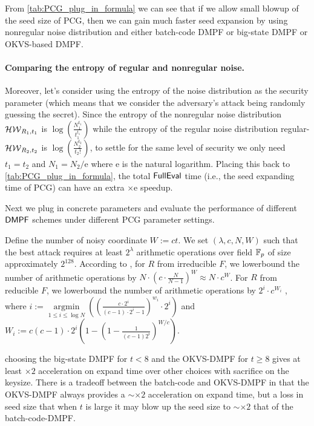 
From \cref{tab:PCG_plug_in_formula} we can see that if we allow small blowup of the seed size of PCG, then we can gain much faster seed expansion by using nonregular noise distribution and either batch-code DMPF or big-state DMPF or OKVS-based DMPF. 

\paragraph{Comparing the entropy of regular and nonregular noise.}Moreover, let's consider using the entropy of the noise distribution as the security parameter (which means that we consider the adversary's attack being randomly guessing the secret). Since the entropy of the nonregular noise distribution $\mathcal{HW}_{R_1,t_1}$ is $\log(\frac{N_1^{t_1}}{t_1^{t_1}})$ while the entropy of the regular noise distribution regular-$\mathcal{HW}_{R_2,t_2}$ is $\log(\frac{N_2^{t_2}}{t_2!})$, to settle for the same level of security we only need $t_1=t_2$ and $N_1 = N_2/\mathrm{e}$ where $\mathrm{e}$ is the natural logarithm. Placing this back to \cref{tab:PCG_plug_in_formula}, the total ${\sf FullEval}$ time (i.e., the seed expanding time of PCG) can have an extra $\times \mathrm{e}$ speedup. 


Next we plug in concrete parameters and evaluate the performance of different ${\sf DMPF}$ schemes under different PCG parameter settings. 

Define the number of noisy coordinate $W:=ct$. We set $(\lambda, c, N, W)$ such that the best attack requires at least $2^\lambda$ arithmetic operations over field $\mathbb{F}_p$ of size approximately $2^{128}$. According to \cite{cryptoeprint:2022/1035}, for $R$ from irreducible $F$, we lowerbound the number of arithmetic operations by $N\cdot (c\cdot \frac{N}{N-1})^W\approx N\cdot c^W$. For $R$ from reducible $F$, we lowerbound the number of arithmetic operations by $2^i\cdot c^{W_i}$ , where $i:=\mathop{\arg\min}\limits_{1\le i\le \log N}\left((\frac{c\cdot 2^i}{(c-1)\cdot 2^i-1})^{w_i}\cdot 2^i\right)$ and $W_i:=c(c-1)\cdot 2^i\left(1-(1-\frac{1}{(c-1)2^i})^{W/c}\right)$. 


 choosing the big-state DMPF for $t<8$ and the OKVS-DMPF for $t\ge 8$ gives at least $\times 2$ acceleration on expand time over other choices with sacrifice on the keysize. There is a tradeoff between the batch-code and OKVS-DMPF in that the OKVS-DMPF always provides a $\sim\times 2$ acceleration on expand time, but a loss in seed size that when $t$ is large it may blow up the seed size to $\sim \times 2$ that of the batch-code-DMPF. 

